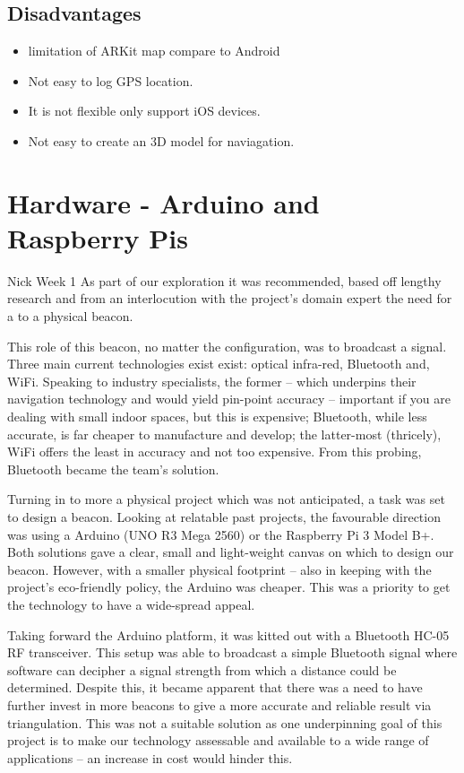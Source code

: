 \subsection{Disadvantages}
\begin{itemize}
    \item limitation of ARKit map compare to Android
    \item Not easy to log GPS location.
    \item It is not flexible only support iOS devices.
    \item Not easy to create an 3D model for naviagation.
\end{itemize}


\section{Hardware - Arduino and Raspberry Pis}
Nick Week 1
As part of our exploration it was recommended, based off lengthy research and from an interlocution with the project’s domain expert the need for a to a physical beacon. 

This role of this beacon, no matter the configuration, was to broadcast a signal. Three main current technologies exist exist: optical infra-red, Bluetooth and, WiFi. Speaking to industry specialists, the former – which underpins their navigation technology and would yield pin-point accuracy – important if you are dealing with small indoor spaces, but this is expensive; Bluetooth, while less accurate, is far cheaper to manufacture and develop; the latter-most (thricely), WiFi offers the least in accuracy and not too expensive. From this probing, Bluetooth became the team’s solution.

Turning in to more a physical project which was not anticipated, a task was set to design a beacon. Looking at relatable past projects, the favourable direction was using a Arduino (UNO R3 Mega 2560) or the Raspberry Pi 3 Model B+. Both solutions gave a clear, small and light-weight canvas on which to design our beacon. However, with a smaller physical footprint – also in keeping with the project’s eco-friendly policy, the Arduino was cheaper. This was a priority to get the technology to have a wide-spread appeal. 

Taking forward the Arduino platform, it was kitted out with a Bluetooth HC-05 RF transceiver. This setup was able to broadcast a simple Bluetooth signal where software can decipher a signal strength from which a distance could be determined. Despite this, it became apparent that there was a need to have further invest in more beacons to give a more accurate and reliable result via triangulation. This was not a suitable solution as one underpinning goal of this project is to make our technology assessable and available to a wide range of applications – an increase in cost would hinder this.

